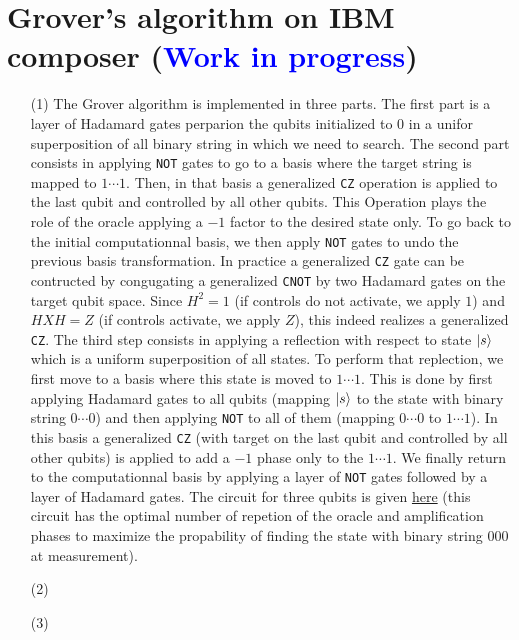 \documentclass[10pt, a4paper]{article}
\begin{document}
{\newpage

\section{Grover's algorithm on IBM composer (\textcolor{blue}{Work in progress})}

\begin{enumerate}
  \item[(1)] The Grover algorithm is implemented in three parts. The first part is a layer of Hadamard gates perparion the qubits initialized to $0$ in a unifor superposition of all binary string in which we need to search. The second part consists in applying \verb|NOT| gates to go to a basis where the target string is mapped to $1\cdots 1$. Then, in that basis a generalized \verb|CZ| operation is applied to the last qubit and controlled by all other qubits. This Operation plays the role of the oracle applying a $-1$ factor to the desired state only. To go back to the initial computationnal basis, we then apply \verb|NOT| gates to undo the previous basis transformation. In practice a generalized \verb|CZ| gate can be contructed by congugating a generalized \verb|CNOT| by two Hadamard gates on the target qubit space. Since $H^2 = 1$ (if controls do not activate, we apply $1$) and $HXH = Z$ (if controls activate, we apply $Z$), this indeed realizes a generalized \verb|CZ|. The third step consists in applying a reflection with respect to state $\ket{s}$ which is a uniform superposition of all states. To perform that replection, we first move to a basis where this state is moved to $1\cdots 1$. This is done by first applying Hadamard gates to all qubits (mapping $\ket{s}$ to the state with binary string  $0 \cdots 0$) and then applying \verb|NOT| to all of them (mapping $0 \cdots 0$ to $1 \cdots 1$). In this basis a generalized \verb|CZ| (with target on the last qubit and controlled by all other qubits) is applied to add a $-1$ phase only to the $1 \cdots 1$. We finally return to the computationnal basis by applying a layer of \verb|NOT| gates followed by a layer of Hadamard gates. The circuit for three qubits is given \href{quantum.ibm.com/composer/files/new?initial=N4IgdghgtgpiBcICKBJA%2BgCQOoCY0EY0AGEkAGhABMYBnAYwCcBLABwBcmB7MBEckAI4QaUXgHkACgFEAckgCCAZQCyAAhwA6IgG4AOmCZg6AGwCu1VbsExjTAEb4Nhulb1h9AhjADmqgQG0AZgBdN0YfVTp-ABZQ-X0ACz9-IjiwJID8NIz-HDS7CAZmGAZk1LcCoqYS5KyKwuLSgLy3AA8ytPbMzuSW-UrGjvqqmu63HL6jOi6U4LJaud78huqm2eHBscSltqH9Gbr9nf6V0fWTkbXDsAHV4-S9h62n3J6A8qPnmcnbs4%2Bb05XbL3OjTDrzboQ14bO7vZaXBbje4zf4HN7Q7ZwpHPCbwzbnAEI56-NaTFHo67fPGwgkkxGYjFTclQrJQn6Ax50nHIx5o3bNal-QVAmFnSY5f45a64-kEvmfRlc2kc7kCsJguEsxZqi74-5K6U8rEKyn3CXA1WM-QAemtqgAAnROGYoGAaKoUmQiF6yPhff6cGRA4HAmRQ6HomQAKzR2MANjICYTAHYyKnUwAOMhZrMATjI%2Bfz%2BG9xd9Jb9%2BEDld9VdD%2BDrdcj%2BCbTZj%2BDbbYT%2BC7XdT%2BD7faz%2BCLI6D3pw4-Hfpw0%2BnwfnQdDOCXS8jODXa5jOAT26DO9TOAPB6zOBPGeC%2BhAAF8gA}{here} (this circuit has the optimal number of repetion of the oracle and amplification phases to maximize the propability of finding the state with binary string $000$ at measurement).  
  \item[(2)]
  \item[(3)] 
\end{enumerate}

}
\end{document}
